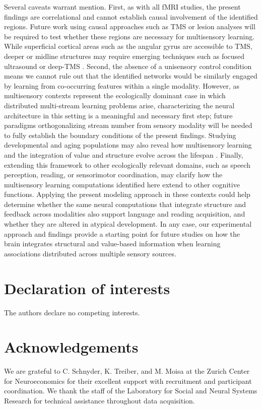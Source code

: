 \documentclass{article}
\begin{document}
Several caveats warrant mention. First, as with all fMRI studies, the present findings are correlational and cannot establish causal involvement of the identified regions. Future work using causal approaches such as TMS \cite{walsh2003transcranial,pascual2000transcranial,burt2002neuropsychiatric} or lesion analyses \cite{rorden2004using} will be required to test whether these regions are necessary for multisensory learning. While superficial cortical areas such as the angular gyrus are accessible to TMS, deeper or midline structures may require emerging techniques such as focused ultrasound \cite{grossman2017noninvasive,folloni2019manipulation} or deep-TMS \cite{levkovitz2015efficacy}. Second, the absence of a unisensory control condition means we cannot rule out that the identified networks would be similarly engaged by learning from co-occurring features within a single modality. However, as multisensory contexts represent the ecologically dominant case in which distributed multi-stream learning problems arise, characterizing the neural architecture in this setting is a meaningful and necessary first step; future paradigms orthogonalizing stream number from sensory modality will be needed to fully establish the boundary conditions of the present findings. Studying developmental and aging populations may also reveal how multisensory learning and the integration of value and structure evolve across the lifespan \cite{raduner2025growing}. Finally, extending this framework to other ecologically relevant domains, such as speech perception, reading, or sensorimotor coordination, may clarify how the multisensory learning computations identified here extend to other cognitive functions. Applying the present modeling approach in these contexts could help determine whether the same neural computations that integrate structure and feedback across modalities also support language and reading acquisition, and whether they are altered in atypical development. In any case, our experimental approach and findings provide a  starting point for future studies on how the brain integrates structural and value-based information when learning associations distributed across multiple sensory sources.


\section*{Declaration of interests}
The authors declare no competing interests.

\section*{Acknowledgements}
We are grateful to C. Schnyder, K. Treiber, and M. Moisa at the Zurich Center for Neuroeconomics for their excellent support with recruitment and participant coordination. We thank the staff of the Laboratory for Social and Neural Systems Research for technical assistance throughout data acquisition. 
\end{document}
